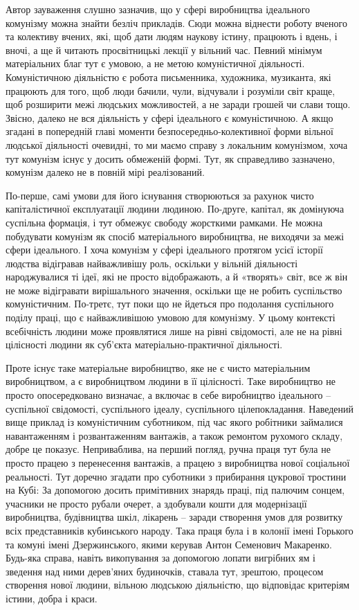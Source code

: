 \documentclass[../main]{subfiles}
\begin{document}
Автор зауваження слушно зазначив, що у сфері виробництва ідеального комунізму можна знайти безліч прикладів. Сюди можна віднести роботу вченого та колективу вчених, які, щоб дати людям наукову істину, працюють і вдень, і вночі, а ще й читають просвітницькі лекції у вільний час. Певний мінімум матеріальних благ тут є умовою, а не метою комуністичної діяльності. Комуністичною діяльністю є робота письменника, художника, музиканта, які працюють для того, щоб люди бачили, чули, відчували і розуміли світ краще, щоб розширити межі людських можливостей, а не заради грошей чи слави тощо. Звісно, далеко не вся діяльність у сфері ідеального є комуністичною. А якщо згадані в попередній главі моменти безпосередньо-колективної форми вільної людської діяльності очевидні, то ми маємо справу з локальним комунізмом, хоча тут комунізм існує у досить обмеженій формі. Тут, як справедливо зазначено, комунізм далеко не в повній мірі реалізований.

По-перше, самі умови для його існування створюються за рахунок чисто капіталістичної експлуатації людини людиною. По-друге, капітал, як домінуюча суспільна формація, і тут обмежує свободу жорсткими рамками. Не можна побудувати комунізм як спосіб матеріального виробництва, не виходячи за межі сфери ідеального. І хоча комунізм у сфері ідеального протягом усієї історії людства відігравав найважливішу роль, оскільки у вільній діяльності народжувалися ті ідеї, які не просто відображають, а й «творять» світ, все ж він не може відігравати вирішального значення, оскільки ще не робить суспільство комуністичним. По-третє, тут поки що не йдеться про подолання суспільного поділу праці, що є найважливішою умовою для комунізму. У цьому контексті всебічність людини може проявлятися лише на рівні свідомості, але не на рівні цілісності людини як суб’єкта матеріально-практичної діяльності.

Проте існує таке матеріальне виробництво, яке не є чисто матеріальним виробництвом, а є виробництвом людини в її цілісності. Таке виробництво не просто опосередковано визначає, а включає в себе виробництво ідеального – суспільної свідомості, суспільного ідеалу, суспільного цілепокладання. Наведений вище приклад із комуністичним суботником, під час якого робітники займалися навантаженням і розвантаженням вантажів, а також ремонтом рухомого складу, добре це показує. Неприваблива, на перший погляд, ручна праця тут була не просто працею з перенесення вантажів, а працею з виробництва нової соціальної реальності. Тут доречно згадати про суботники з прибирання цукрової тростини на Кубі: За допомогою досить примітивних знарядь праці, під палючим сонцем, учасники не просто рубали очерет, а здобували кошти для модернізації виробництва, будівництва шкіл, лікарень – заради створення умов для розвитку всіх представників кубинського народу. Така праця була і в колонії імені Горького та комуні імені Дзержинського, якими керував Антон Семенович Макаренко. Будь-яка справа, навіть викопування за допомогою лопати вигрібних ям і зведення над ними дерев’яних будиночків, ставала тут, зрештою, процесом створення нової людини, вільною людською діяльністю, що відповідає критеріям істини, добра і краси.
\end{document}

